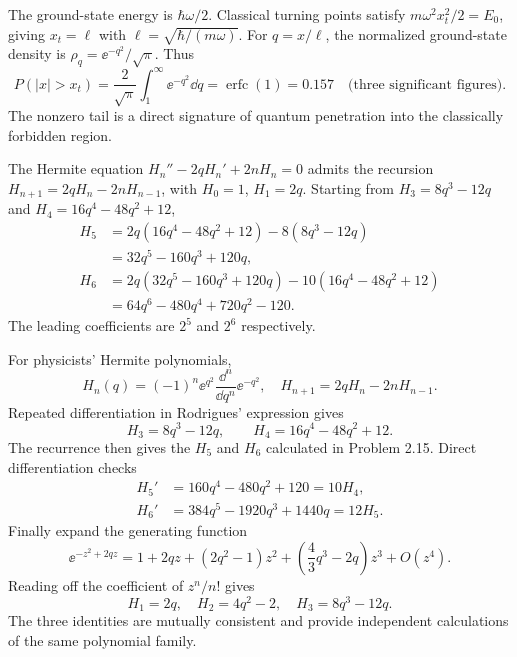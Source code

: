 The ground-state energy is $\hbar\omega/2$.
Classical turning points satisfy
$m\omega^2x_t^2/2=E_0$, giving $x_t=\ell$
with $\ell=\sqrt{\hbar/(m\omega)}$.
For $q=x/\ell$, the normalized ground-state density is
$\rho_q=\ee^{-q^2}/\sqrt\pi$. Thus
\begin{equation}
P(|x|>x_t)=\frac{2}{\sqrt\pi}
\int_1^\infty \ee^{-q^2}\dd q
=\operatorname{erfc}(1)
=\boxed{0.157\quad\text{(three significant figures)}}.
\end{equation}
The nonzero tail is a direct signature of quantum
penetration into the classically forbidden region.

The Hermite equation $H_n''-2qH_n'+2nH_n=0$
admits the recursion
$H_{n+1}=2qH_n-2nH_{n-1}$,
with $H_0=1$, $H_1=2q$.
Starting from $H_3=8q^3-12q$ and
$H_4=16q^4-48q^2+12$,
\begin{align}
H_5&=2q(16q^4-48q^2+12)-8(8q^3-12q)\\
&=\boxed{32q^5-160q^3+120q},\\
H_6&=2q(32q^5-160q^3+120q)-10(16q^4-48q^2+12)\\
&=\boxed{64q^6-480q^4+720q^2-120}.
\end{align}
The leading coefficients are $2^5$ and $2^6$ respectively.

For physicists' Hermite polynomials,
\begin{equation}
H_n(q)=(-1)^n\ee^{q^2}\frac{\dd^n}{\dd q^n}
\ee^{-q^2},\quad
H_{n+1}=2qH_n-2nH_{n-1}.
\end{equation}
Repeated differentiation in Rodrigues' expression gives
\begin{equation}
H_3=8q^3-12q,\qquad
H_4=16q^4-48q^2+12.
\end{equation}
The recurrence then gives the $H_5$ and $H_6$
calculated in Problem 2.15. Direct differentiation checks
\begin{align}
H_5'&=160q^4-480q^2+120=10H_4,\\
H_6'&=384q^5-1920q^3+1440q=12H_5.
\end{align}
Finally expand the generating function
\begin{equation}
\ee^{-z^2+2qz}
=1+2qz+(2q^2-1)z^2+
\left(\frac43q^3-2q\right)z^3+O(z^4).
\end{equation}
Reading off the coefficient of $z^n/n!$ gives
\begin{equation}
\boxed{H_1=2q,\quad H_2=4q^2-2,\quad H_3=8q^3-12q}.
\end{equation}
The three identities are mutually consistent and provide
independent calculations of the same polynomial family.
